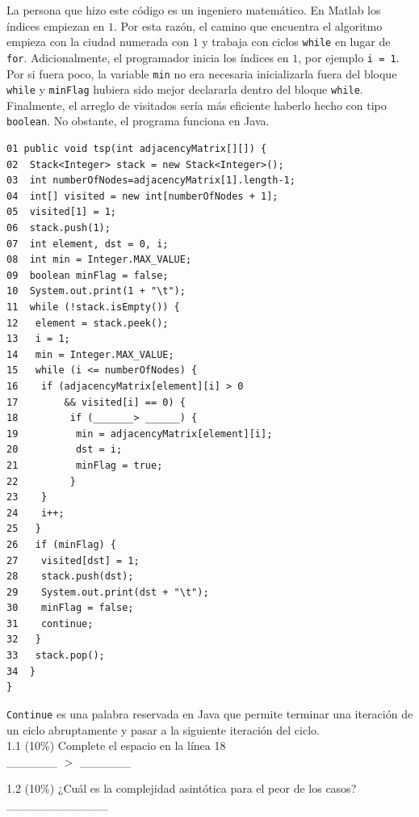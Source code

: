 \documentclass[twocolumn]{article}
\begin{document}
La persona que hizo este código es un ingeniero matemático. En Matlab los índices
empiezan en $1$. Por esta razón, el camino que encuentra el algoritmo empieza con la ciudad numerada con $1$ y trabaja
con ciclos \texttt{while} en lugar de \texttt{for}. Adicionalmente, el programador inicia los índices en $1$, por ejemplo \texttt{i = 1}. Por si fuera poco, 
la variable \texttt{min} no era necesaria inicializarla fuera del bloque \texttt{while} y \texttt{minFlag} hubiera sido
mejor declararla dentro del bloque \texttt{while}. Finalmente,
 el arreglo de visitados sería más eficiente haberlo hecho con tipo \texttt{boolean}. No obstante,
 el programa funciona en Java.

{\small
\begin{verbatim}
01 public void tsp(int adjacencyMatrix[][]) {
02  Stack<Integer> stack = new Stack<Integer>();
03  int numberOfNodes=adjacencyMatrix[1].length-1;
04  int[] visited = new int[numberOfNodes + 1];
05  visited[1] = 1;
06  stack.push(1);
07  int element, dst = 0, i;
08  int min = Integer.MAX_VALUE;
09  boolean minFlag = false;
10  System.out.print(1 + "\t");
11  while (!stack.isEmpty()) {
12   element = stack.peek();
13   i = 1;
14   min = Integer.MAX_VALUE;
15   while (i <= numberOfNodes) {
16    if (adjacencyMatrix[element][i] > 0 
17        && visited[i] == 0) {
18         if (_______> ______) {
19          min = adjacencyMatrix[element][i];
20          dst = i;
21          minFlag = true;
22         }
23    }
24    i++;
25   }
26   if (minFlag) {
27    visited[dst] = 1;
28    stack.push(dst);
29    System.out.print(dst + "\t");
30    minFlag = false;
31    continue;
32   }
33   stack.pop();
34  }
}
\end{verbatim}
}

\texttt{Continue} es una palabra reservada en Java que permite terminar una iteración
de un ciclo abruptamente y pasar a la siguiente iteración del ciclo.\\

1.1  (10\%) Complete el espacio en la línea 18\\


  \_\_\_\_\_\_ $>$ \_\_\_\_\_\_

1.2 (10\%) ¿Cuál es la complejidad asintótica para el peor de los casos?\\


  \_\_\_\_\_\_\_\_\_\_\_\_



\end{document}
